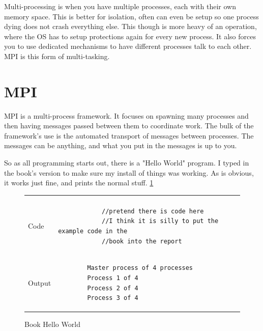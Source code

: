 \documentclass[12pt]{article}
\begin{document}
Multi-processing is when you have multiple processes, each with their own memory space.
This is better for isolation, often can even be setup so one process dying does not crash everything else.
This though is more heavy of an operation, where the OS has to setup protections again for every new process.
It also forces you to use dedicated mechanisms to have different processes talk to each other.
MPI is this form of multi-tasking.

\section{MPI}

MPI is a multi-process framework.
It focuses on spawning many processes and then having messages passed between them to coordinate work.
The bulk of the framework's use is the automated transport of messages between processes.
The messages can be anything, and what you put in the messages is up to you.

So as all programming starts out, there is a "Hello World" program.
I typed in the book's version to make sure my install of things was working.
As is obvious, it works just fine, and prints the normal stuff. \ref{MPI_hello_world}

\begin{figure}[htb]
	\centering
	\begin{tabular}{ l|@{\hskip 16pt}l }
		\hline \\
		Code &
		\begin{minipage}[t]{0.8\textwidth}
		\vspace{-20pt}
		\begin{verbatim}
			//pretend there is code here
			//I think it is silly to put the example code in the
			//book into the report
		\end{verbatim}
		\end{minipage}
		\\ \hline
		Output &
		\begin{minipage}[t]{0.8\textwidth}
		\begin{verbatim}
		Master process of 4 processes
		Process 1 of 4
		Process 2 of 4
		Process 3 of 4
		\end{verbatim}
		\end{minipage}
		\\ \hline
	\end{tabular}
	\caption{Book Hello World}
	\label{MPI_hello_world}
\end{figure}
\end{document}
